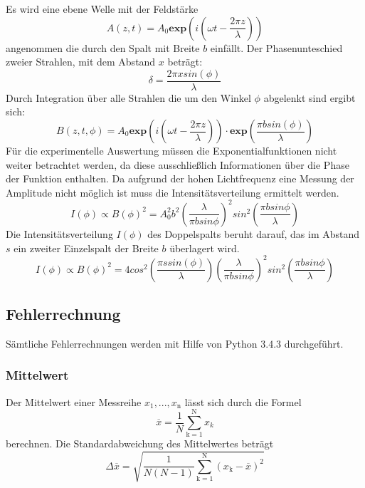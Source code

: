 Es wird eine ebene Welle mit der Feldstärke
\begin{equation}
  A(z,t)= A_0 \textbf{exp} \left( i \left( \omega t - \frac{2 \pi z}{\lambda}   \right) \right)
  \label{eqn:welle}
\end{equation}
angenommen die durch den Spalt mit Breite $b$ einfällt. Der Phasenunteschied zweier Strahlen, mit dem Abstand $x$ beträgt:
\begin{equation}
  \delta = \frac{2 \pi x sin(\phi)}{\lambda}
  \label{eqn:phase}
\end{equation}
Durch Integration über alle Strahlen die um den Winkel $\phi$ abgelenkt sind ergibt sich:
\begin{equation}
  B(z,t,\phi) = A_0 \textbf{exp} \left( i \left( \omega t - \frac{2 \pi z}{\lambda} \right) \right) \cdot \textbf{exp} \left( \frac{\pi b sin(\phi)}{\lambda} \right)
  \label{}
\end{equation}
Für die experimentelle Auswertung müssen die Exponentialfunktionen nicht weiter betrachtet werden, da diese ausschließlich Informationen über die Phase der Funktion enthalten. Da aufgrund der hohen Lichtfrequenz eine Messung der Amplitude nicht möglich ist muss die Intensitätsverteilung ermittelt werden.
\begin{equation}
  I(\phi) \propto B(\phi)^2 = A_0^2 b^2 \left( \frac{\lambda}{\pi b sin \phi} \right)^2 sin^2 \left( \frac{\pi b sin \phi}{\lambda} \right)
  \label{eqn:I}
\end{equation}
Die Intensitätsverteilung $I(\phi)$ des Doppelspalts beruht darauf, das im Abstand $s$ ein zweiter Einzelspalt der Breite $b$ überlagert wird.
\begin{equation}
  I(\phi) \propto B(\phi)^2 = 4cos^2\left( \frac{\pi s sin(\phi)}{\lambda} \right) \left( \frac{\lambda}{\pi b sin \phi} \right)^2 sin^2 \left( \frac{\pi b sin \phi}{\lambda} \right)
  \label{eqn:Id}
\end{equation}

\subsection{Fehlerrechnung}
Sämtliche Fehlerrechnungen werden mit Hilfe von Python 3.4.3 durchgeführt.
\subsubsection{Mittelwert}
Der Mittelwert einer Messreihe $x_\text{1}, ... ,x_\text{n}$ lässt sich durch die Formel
\begin{equation}
	\overline{x} = \frac{1}{N} \sum_{\text{k}=1}^\text{N} x_k
	\label{eqn:ave}
\end{equation}
berechnen. Die Standardabweichung des Mittelwertes beträgt
\begin{equation}
	\Delta \overline{x} = \sqrt{ \frac{1}{N(N-1)} \sum_{\text{k}=1}^\text{N} (x_\text{k} - \overline{x})^2}
	\label{eqn:std}
\end{equation}

